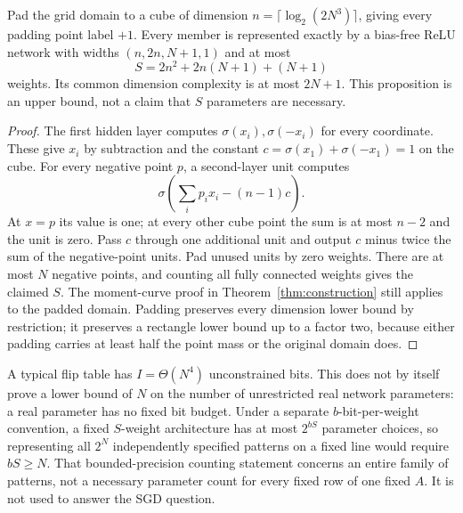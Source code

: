 \begin{samepage}
\begin{proposition}\label{thm:network}
Pad the grid domain to a cube of dimension $n=\lceil\log_2(2N^3)\rceil$, giving every padding point label $+1$. Every member is represented exactly by a bias-free ReLU network with widths $(n,2n,N+1,1)$ and at most
\[
 S=2n^2+2n(N+1)+(N+1)
\]
weights. Its common dimension complexity is at most $2N+1$. This proposition is an upper bound, not a claim that $S$ parameters are necessary.
\end{proposition}
\end{samepage}
\begin{proof}
The first hidden layer computes $\sigma(x_i),\sigma(-x_i)$ for every coordinate. These give $x_i$ by subtraction and the constant $c=\sigma(x_1)+\sigma(-x_1)=1$ on the cube. For every negative point $p$, a second-layer unit computes
\[
 \sigma\left(\sum_i p_ix_i-(n-1)c\right).
\]
At $x=p$ its value is one; at every other cube point the sum is at most $n-2$ and the unit is zero. Pass $c$ through one additional unit and output $c$ minus twice the sum of the negative-point units. Pad unused units by zero weights. There are at most $N$ negative points, and counting all fully connected weights gives the claimed $S$. The moment-curve proof in Theorem~\ref{thm:construction} still applies to the padded domain. Padding preserves every dimension lower bound by restriction; it preserves a rectangle lower bound up to a factor two, because either padding carries at least half the point mass or the original domain does.
\end{proof}

A typical flip table has $I=\Theta(N^4)$ unconstrained bits. This does not by itself prove a lower bound of $N$ on the number of unrestricted real network parameters: a real parameter has no fixed bit budget. Under a separate $b$-bit-per-weight convention, a fixed $S$-weight architecture has at most $2^{bS}$ parameter choices, so representing all $2^N$ independently specified patterns on a fixed line would require $bS\ge N$. That bounded-precision counting statement concerns an entire family of patterns, not a necessary parameter count for every fixed row of one fixed $A$. It is not used to answer the SGD question.

